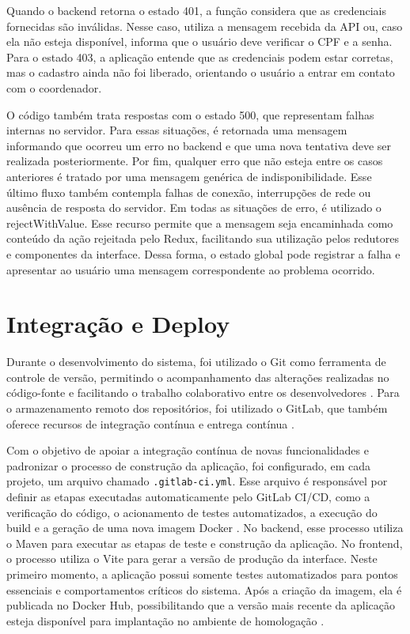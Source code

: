 Quando o backend retorna o estado 401, a função considera que as credenciais fornecidas são inválidas. Nesse caso, utiliza a mensagem recebida da API ou, caso ela não esteja disponível, informa que o usuário deve verificar o CPF e a senha. Para o estado 403, a aplicação entende que as credenciais podem estar corretas, mas o cadastro ainda não foi liberado, orientando o usuário a entrar em contato com o coordenador.

O código também trata respostas com o estado 500, que representam falhas internas no servidor. Para essas situações, é retornada uma mensagem informando que ocorreu um erro no backend e que uma nova tentativa deve ser realizada posteriormente. Por fim, qualquer erro que não esteja entre os casos anteriores é tratado por uma mensagem genérica de indisponibilidade. Esse último fluxo também contempla falhas de conexão, interrupções de rede ou ausência de resposta do servidor.
Em todas as situações de erro, é utilizado o rejectWithValue. Esse recurso permite que a mensagem seja encaminhada como conteúdo da ação rejeitada pelo Redux, facilitando sua utilização pelos redutores e componentes da interface. Dessa forma, o estado global pode registrar a falha e apresentar ao usuário uma mensagem correspondente ao problema ocorrido.


\section{Integração e Deploy}

Durante o desenvolvimento do sistema, foi utilizado o Git como ferramenta de controle de versão, permitindo o acompanhamento das alterações realizadas no código-fonte e facilitando o trabalho colaborativo entre os desenvolvedores \cite{chacon2014}. Para o armazenamento remoto dos repositórios, foi utilizado o GitLab, que também oferece recursos de integração contínua e entrega contínua \cite{gitlab2026}.

Com o objetivo de apoiar a integração contínua de novas funcionalidades e padronizar o processo de construção da aplicação, foi configurado, em cada projeto, um arquivo chamado \texttt{.gitlab-ci.yml}. Esse arquivo é responsável por definir as etapas executadas automaticamente pelo GitLab CI/CD, como a verificação do código, o acionamento de testes automatizados, a execução do build e a geração de uma nova imagem Docker \cite{gitlabcicd2026,docker2026}. No backend, esse processo utiliza o Maven para executar as etapas de teste e construção da aplicação. No frontend, o processo utiliza o Vite para gerar a versão de produção da interface. Neste primeiro momento, a aplicação possui somente testes automatizados para pontos essenciais e comportamentos críticos do sistema. Após a criação da imagem, ela é publicada no Docker Hub, possibilitando que a versão mais recente da aplicação esteja disponível para implantação no ambiente de homologação \cite{dockerhub2026}.

